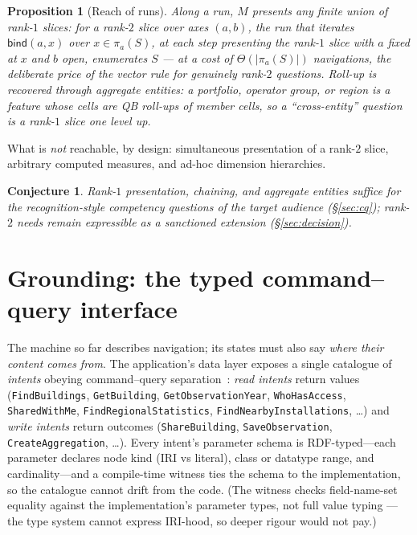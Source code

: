 \documentclass[11pt,a4paper]{article}
\newtheorem{proposition}{Proposition}[section]
\newtheorem{conjecture}{Conjecture}[section]
\theoremstyle{remark}
\newcommand{\vbind}{\mathsf{bind}}
\begin{document}
\begin{proposition}[Reach of runs]\label{prop:reach}
Along a run, $M$ presents any finite union of rank-$1$ slices: for a rank-$2$
slice over axes $(a,b)$, the run that iterates $\vbind(a, x)$ over
$x \in \pi_a(S)$, at each step presenting the rank-$1$ slice with $a$ fixed at $x$
and $b$ open, enumerates $S$ --- at a cost of $\Theta(|\pi_a(S)|)$ navigations,
the deliberate price of the vector rule for genuinely rank-$2$ questions.
Roll-up is recovered through aggregate entities:
a portfolio, operator group, or region is a feature whose cells are QB roll-ups of
member cells, so a ``cross-entity'' question is a rank-$1$ slice one level up.
\end{proposition}

What is \emph{not} reachable, by design: simultaneous presentation of a rank-$2$
slice, arbitrary computed measures, and ad-hoc dimension hierarchies.

\begin{conjecture}\label{conj:sufficiency}
Rank-$1$ presentation, chaining, and aggregate entities suffice for the
recognition-style competency questions of the target audience
(\S\ref{sec:cq}); rank-$2$ needs remain expressible as a sanctioned extension
(\S\ref{sec:decision}).
\end{conjecture}

\section{Grounding: the typed command--query interface}\label{sec:grounding}

The machine so far describes navigation; its states must also say \emph{where their
content comes from}. The application's data layer exposes a single catalogue of
\emph{intents} obeying command--query separation~\cite{meyer}: \emph{read intents}
return values (\texttt{FindBuildings}, \texttt{GetBuilding},
\texttt{GetObservationYear}, \texttt{WhoHasAccess}, \texttt{SharedWithMe},
\texttt{FindRegionalStatistics}, \texttt{FindNearbyInstallations}, \ldots) and
\emph{write intents} return outcomes (\texttt{ShareBuilding},
\texttt{SaveObservation}, \texttt{CreateAggregation}, \ldots). Every intent's
parameter schema is RDF-typed---each parameter declares node kind (IRI vs literal),
class or datatype range, and cardinality---and a compile-time witness ties the
schema to the implementation, so the catalogue cannot drift from the code. (The
witness checks field-name-set equality against the implementation's parameter
types, not full value typing --- the type system cannot express IRI-hood, so
deeper rigour would not pay.)
\end{document}
